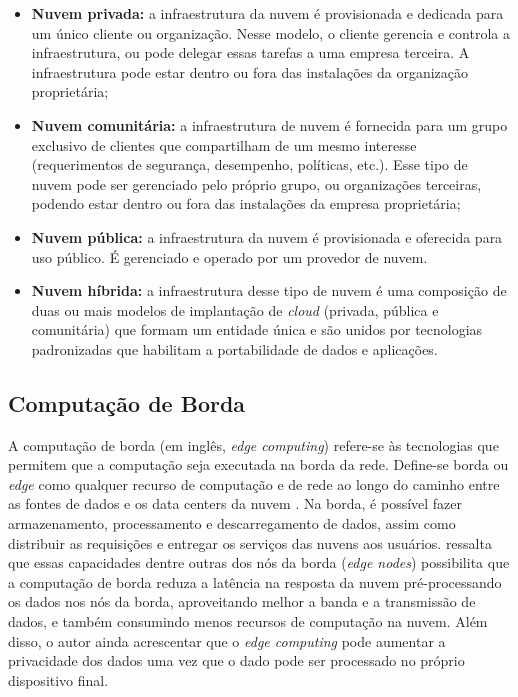 \begin{itemize}
    
    \item \textbf{Nuvem privada:} a infraestrutura da nuvem é provisionada e
    dedicada para um único cliente ou organização. Nesse modelo, o cliente
    gerencia e controla a infraestrutura, ou pode delegar essas tarefas a uma
    empresa terceira. A infraestrutura pode estar dentro ou fora das instalações
    da organização proprietária;

    \item \textbf{Nuvem comunitária:} a infraestrutura de nuvem é fornecida para
    um grupo exclusivo de clientes que compartilham de um mesmo interesse
    (requerimentos de segurança, desempenho, políticas, etc.). Esse tipo de
    nuvem pode ser gerenciado pelo próprio grupo, ou organizações terceiras,
    podendo estar dentro ou fora das instalações da empresa proprietária;

    \item \textbf{Nuvem pública:} a infraestrutura da nuvem é provisionada e
    oferecida para uso público. É gerenciado e operado por um provedor de nuvem.
    
    \item \textbf{Nuvem híbrida:} a infraestrutura desse tipo de nuvem é uma
    composição de duas ou mais modelos de implantação de \emph{cloud} (privada,
    pública e comunitária) que formam um entidade única e são unidos por
    tecnologias padronizadas que habilitam a portabilidade de dados e
    aplicações.

\end{itemize}

\subsection{Computação de Borda}

A computação de borda (em inglês, \emph{edge computing}) refere-se às
tecnologias que permitem que a computação seja executada na borda da rede.
Define-se borda ou \emph{edge} como qualquer recurso de computação e de rede ao
longo do caminho entre as fontes de dados e os data centers da nuvem
\cite{Shi2016}. Na borda, é possível fazer armazenamento, processamento e
descarregamento de dados, assim como distribuir as requisições e entregar os
serviços das nuvens aos usuários.  ressalta que essas
capacidades dentre outras dos nós da borda (\emph{edge nodes}) possibilita que a
computação de borda reduza a latência na resposta da nuvem pré-processando os
dados nos nós da borda, aproveitando melhor a banda e a transmissão de dados, e
também consumindo menos recursos de computação na nuvem. Além disso, o autor
ainda acrescentar que o \emph{edge computing} pode aumentar a privacidade dos
dados uma vez que o dado pode ser processado no próprio dispositivo final.

